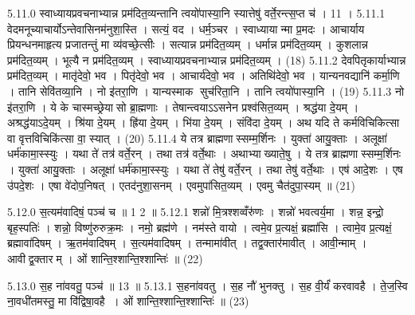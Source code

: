 5.11.0
स्वाध्यायप्रवचनाभ्यान्न प्रम॑दित॒व्यन्तानि त्वयो॑पास्या॒नि स्यात्तेषु॑ वर्ते॒रन्त्स॒प्त च॑ । 11 ।
5.11.1
वेदमनूच्याचार्योऽन्तेवासिनम॑नुशा॒स्ति । सत्यं॒ वद । धर्म॒ञ्चर । स्वाध्यायान्मा प्र॒मदः । आचार्याय प्रियन्धनमाहृत्य प्रजातन्तुं मा व्य॑वच्छे॒त्सीः । सत्यान्न प्रम॑दित॒व्यम् । धर्मान्न प्रम॑दित॒व्यम् । कुशलान्न प्रम॑दित॒व्यम् । भूत्यै न प्रम॑दित॒व्यम् । स्वाध्यायप्रवचनाभ्यान्न प्रम॑दित॒व्यम् । (18)
5.11.2
देवपितृकार्याभ्यान्न प्रम॑दित॒व्यम् । मातृ॑देवो॒ भव । पितृ॑देवो॒ भव । आचार्य॑देवो॒ भव । अतिथि॑देवो॒ भव । यान्यनवद्यानि॑ कर्मा॒णि । तानि सेवि॑तव्या॒नि । नो इ॑तरा॒णि । यान्यस्माक सुच॑रिता॒नि । तानि त्वयो॑पास्या॒नि । (19)
5.11.3
नो इ॑तरा॒णि । ये के चास्मच्छ्रेयासो ब्रा॒ह्मणाः । तेषान्त्वयाऽऽसनेन प्रश्व॑सित॒व्यम् । श्रद्ध॑या दे॒यम् । अश्रद्ध॑याऽदे॒यम् । श्रि॑या दे॒यम् । ह्रि॑या दे॒यम् । भि॑या दे॒यम् । संवि॑दा दे॒यम् । अथ यदि ते कर्मविचिकित्सा वा वृत्तविचिकि॑त्सा वा॒ स्यात् । (20)
5.11.4
ये तत्र ब्राह्मणास्सम्म॒र्\mbox{}शिनः । युक्ता॑ आयु॒क्ताः । अलूक्षा॑ धर्म॑कामा॒स्स्युः । यथा ते॑ तत्र॑ वर्ते॒रन् । तथा तत्र॑ वर्ते॒थाः । अथाभ्याख्याते॒षु । ये तत्र ब्राह्मणास्सम्म॒र्\mbox{}शिनः । युक्ता॑ आयु॒क्ताः । अलूक्षा॑ धर्म॑कामा॒स्स्युः । यथा ते॑ तेषु॑ वर्ते॒रन् । तथा तेषु॑ वर्ते॒थाः । एष॑ आदे॒शः । एष उ॑पदे॒शः । एषा वे॑दोप॒निषत् । एतद॑नुशा॒सनम् । एवमुपा॑सित॒व्यम् । एवमु चैत॑दुपा॒स्यम् ॥ (21)
\anuvakamend

5.12.0
स॒त्यम॑वादिषं॒ पञ्च॑ च ॥ 1 2 ॥
5.12.1
शन्नो॑ मि॒त्रश्शव्वँरु॑णः । शन्नो॑ भवत्वर्य॒मा । शन्न॒ इन्द्रो॒ बृह॒स्पतिः॑ । शन्नो॒ विष्णु॑रुरुक्र॒मः । नमो॒ ब्रह्म॑णे । नम॑स्ते वायो । त्वमे॒व प्र॒त्यक्षं॒ ब्रह्मा॑सि । त्वामे॒व प्र॒त्यक्षं॒ ब्रह्मावा॑दिषम् । ऋ॒तम॑वादिषम् । स॒त्यम॑वादिषम् । तन्मामा॑वीत् । तद्व॒क्तार॑मावीत् । आवी॒न्माम् । आवीद्व॒क्तारम् । ओं शान्ति॒श्शान्ति॒श्शान्तिः॑ ॥ (22)

\setcounter{anuvakam}{0}
5.13.0
स॒ह ना॑ववतु॒ पञ्च॑ ॥ 13 ॥
5.13.1
स॒हना॑ववतु । स॒ह नौ॑ भुनक्तु । स॒ह वी॒र्यं॑ करवावहै । ते॒ज॒स्वि ना॒वधी॑तमस्तु॒ मा वि॑द्विषा॒वहै । ओं शान्ति॒श्शान्ति॒श्शान्तिः॑ ॥ (23)
\anuvakamend

